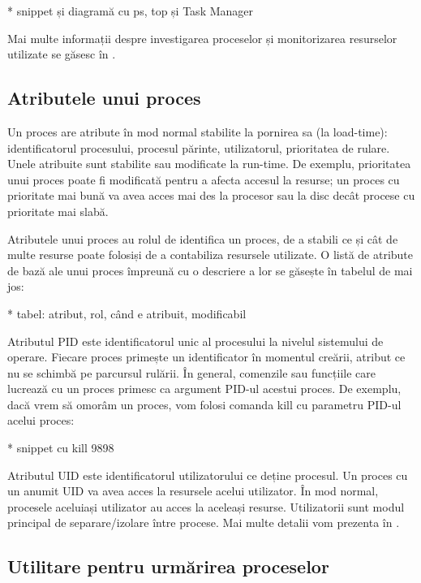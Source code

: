 * snippet și diagramă cu ps, top și Task Manager

Mai multe informații despre investigarea proceselor și monitorizarea resurselor
utilizate se găsesc în .

\subsection{Atributele unui proces}
\label{sec:procese-resurse-atribute}

Un proces are atribute în mod normal stabilite la pornirea sa (la load-time):
identificatorul procesului, procesul părinte, utilizatorul, prioritatea de
rulare. Unele atribuite sunt stabilite sau modificate la run-time. De exemplu,
prioritatea unui proces poate fi modificată pentru a afecta accesul la resurse;
un proces cu prioritate mai bună va avea acces mai des la procesor sau la disc
decât procese cu prioritate mai slabă.

Atributele unui proces au rolul de identifica un proces, de a stabili ce și cât
de multe resurse poate folosiși de a contabiliza resursele utilizate. O listă de
atribute de bază ale unui proces împreună cu o descriere a lor se găsește în
tabelul de mai jos:

* tabel: atribut, rol, când e atribuit, modificabil

Atributul PID este identificatorul unic al procesului la nivelul sistemului de
operare. Fiecare proces primește un identificator în momentul creării, atribut
ce nu se schimbă pe parcursul rulării. În general, comenzile sau funcțiile care
lucrează cu un proces primesc ca argument PID-ul acestui proces. De exemplu,
dacă vrem să omorâm un proces, vom folosi comanda kill cu parametru PID-ul
acelui proces:

* snippet cu kill 9898

Atributul UID este identificatorul utilizatorului ce deține procesul. Un proces
cu un anumit UID va avea acces la resursele acelui utilizator. În mod normal,
procesele aceluiași utilizator au acces la aceleași resurse. Utilizatorii sunt
modul principal de separare/izolare între procese. Mai multe detalii vom
prezenta în .

\subsection{Utilitare pentru urmărirea proceselor}
\label{sec:procese-resurse-monitorizare}


